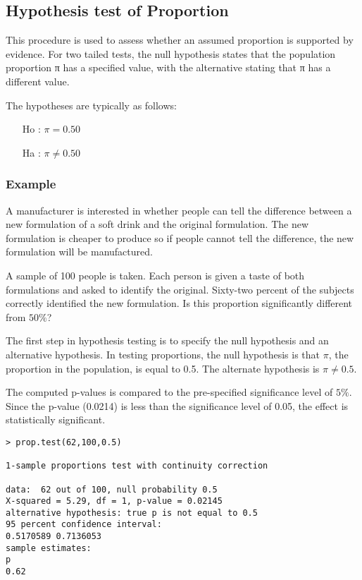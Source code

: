 \newpage




\subsection{Hypothesis test of Proportion}
This procedure is used to assess whether an assumed proportion is supported by evidence. For two tailed tests, the null hypothesis states that the population proportion  π has a specified value, with the alternative stating that π has a different value. 

The hypotheses are typically as follows:   

\begin{itemize}
	\item[Ho] : $\pi = 0.50$
	\item[Ha] : $\pi \neq 0.50$
\end{itemize}

\subsubsection{Example}
A manufacturer is interested in whether people can tell the difference between a new formulation of a soft drink and the original formulation. The new formulation is cheaper to produce so if people cannot tell the difference, the new formulation will be manufactured. 

A sample of 100 people is taken. Each person is given a taste of both formulations and asked to identify the original. Sixty-two percent of the subjects correctly identified the new formulation. Is this proportion significantly different from $50\%$? 

The first step in hypothesis testing is to specify the null hypothesis and an alternative hypothesis. In testing proportions, the null hypothesis is that $\pi$, the proportion in the population, is equal to 0.5. The alternate hypothesis is $\pi \neq 0.5$. 

The computed p-values is compared to the pre-specified significance level of $5\%$. Since the p-value (0.0214) is less than the significance level of 0.05, the effect is statistically significant. 

\begin{verbatim}
> prop.test(62,100,0.5)

1-sample proportions test with continuity correction

data:  62 out of 100, null probability 0.5 
X-squared = 5.29, df = 1, p-value = 0.02145
alternative hypothesis: true p is not equal to 0.5 
95 percent confidence interval:
0.5170589 0.7136053 
sample estimates:
p 
0.62 
\end{verbatim}


